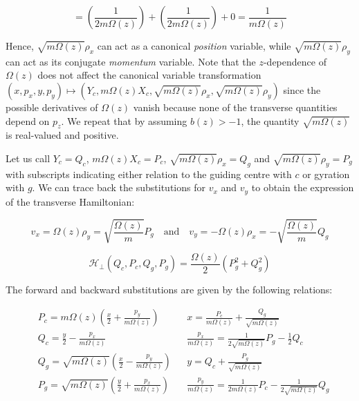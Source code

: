 \begin{equation*}
    =\left(\frac{1}{2m\Omega(z)}\right)+\left(\frac{1}{2m\Omega(z)}\right)+0=\frac{1}{m\Omega(z)}
\end{equation*}

Hence, $\sqrt{m\Omega(z)}\rho_x$ can act as a canonical \textit{position} variable, while $\sqrt{m\Omega(z)}\rho_y$ can act as its conjugate \textit{momentum} variable. Note that the $z$-dependence of $\Omega(z)$ does not affect the canonical variable transformation $(x,p_x,y,p_y)\mapsto(Y_c,m\Omega(z)X_c,\sqrt{m\Omega(z)}\rho_x,\sqrt{m\Omega(z)}\rho_y)$ since the possible derivatives of $\Omega(z)$ vanish because none of the transverse quantities depend on $p_z$. We repeat that by assuming $b(z)>-1$, the quantity $\sqrt{m\Omega(z)}$ is real-valued and positive.

\vspace*{2.5pt}

\quad Let us call $Y_c=Q_c$, $m\Omega(z)X_c=P_c$, $\sqrt{m\Omega(z)}\rho_x=Q_g$ and $\sqrt{m\Omega(z)}\rho_y=P_g$ with subscripts indicating either relation to the guiding centre with $c$ or gyration with $g$. We can trace back the substitutions for $v_x$ and $v_y$ to obtain the expression of the transverse Hamiltonian:

\begin{equation*}
    v_x=\Omega(z)\rho_y=\sqrt{\frac{\Omega(z)}{m}}P_g\quad\text{and}\quad v_y=-\Omega(z)\rho_x=-\sqrt{\frac{\Omega(z)}{m}}Q_g
\end{equation*}

\begin{equation}
    \label{H-47}
    \mathcal{H}_\perp(Q_c,P_c,Q_g,P_g)=\frac{\Omega(z)}{2}\left(P_g^2+Q_g^2\right)
\end{equation}

The forward and backward substitutions are given by the following relations:

\begin{align*}
    &P_c=m\Omega(z)\left(\frac{x}{2}+\frac{p_y}{m\Omega(z)}\right)& &x=\frac{P_c}{m\Omega(z)}+\frac{Q_g}{\sqrt{m\Omega(z)}}\\
    &Q_c=\frac{y}{2}-\frac{p_x}{m\Omega(z)}& &\frac{p_x}{m\Omega(z)}=\frac{1}{2\sqrt{m\Omega(z)}}P_g-\frac{1}{2}Q_c\\
    &Q_g=\sqrt{m\Omega(z)}\left(\frac{x}{2}-\frac{p_y}{m\Omega(z)}\right)& &y=Q_c+\frac{P_g}{\sqrt{m\Omega(z)}}\\
    &P_g=\sqrt{m\Omega(z)}\left(\frac{y}{2}+\frac{p_x}{m\Omega(z)}\right) & &\frac{p_y}{m\Omega(z)}=\frac{1}{2m\Omega(z)}P_c-\frac{1}{2\sqrt{m\Omega(z)}}Q_g
\end{align*}

